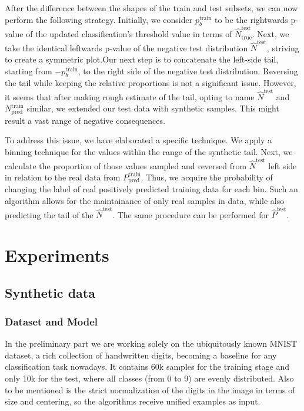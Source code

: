 \documentclass{article}
\begin{document}
After  the difference between the shapes of the train and test subsets, we can now perform the following strategy. Initially, we consider $p^{\text{train}}_{b}$ to be the rightwards p-value of the updated classification's threshold value in terms of $\hat{N}^{\text{test}}_{\text{true}}$. Next, we take the identical leftwards p-value of the negative test distribution $ \hat{N}^{\text{test}}$, striving to create a symmetric plot.Our next step is to concatenate the left-side tail, starting from $-p^{\text{train}}_{b}$, to the right side of the negative test distribution. Reversing the tail while keeping the relative proportions is not a significant issue. However, it seems that after making rough estimate of the tail, opting to name $ \hat{N}^{\text{test}}$ and $N^{\text{train}}_{\text{pred}}$ similar, we extended our test data with synthetic samples. This might result a vast range of negative consequences. 

To address this issue, we have elaborated a specific technique. We apply a binning technique for the values within the range of the synthetic tail. Next, we calculate the proportion of those values sampled and reversed from $ \hat{N}^{\text{test}}$ left side in relation to the real data from $P^{\text{train}}_{\text{pred}}$. Thus, we acquire the probability of changing the label of real positively predicted training data for each bin. Such an algorithm allows for the maintainance of only real samples in data, while also predicting the tail of the $ \hat{N}^{\text{test}}$. The same procedure can be performed for $ \hat{P}^{\text{test}}$.

\section{Experiments}
\subsection{Synthetic data}

\subsubsection{Dataset and Model}

In the preliminary part we are working solely on the ubiquitously known MNIST dataset, a rich collection of handwritten digits, becoming a baseline for any classification task nowadays. It contains 60k samples for the training stage and only 10k for the test, where all classes (from 0 to 9) are evenly distributed. Also to be mentioned is the strict normalization of the digits in the image in terms of size and centering, so the algorithms receive unified examples as input.
\end{document}
